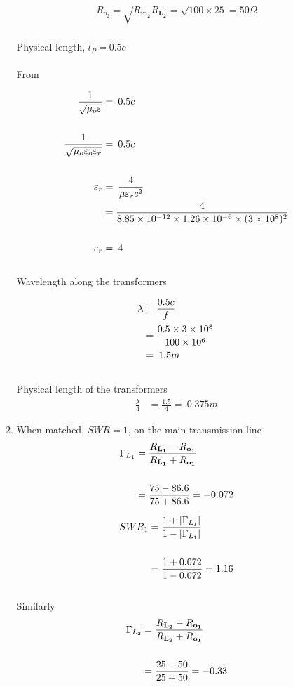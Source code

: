 \documentclass[12pt,a4paper,openright]{report}
\begin{document}
\begin{enumerate}
\begin{enumerate}
			\begin{align*}
			R_{o_2}=\sqrt{R_\mathbf{in_2}R_\mathbf{L_2}}=\sqrt{100\times25}=50\Omega
			\end{align*}
			\\
			Physical length, $l_{P}=0.5c$
			\\
			\\
			From
			
			\begin{align*}
			\frac{1}{\sqrt{\mu_{o} \varepsilon}}&=\medspace 0.5c\\\linebreak\\\notag\frac{1}{\sqrt{\mu_{o} \varepsilon_{o}\varepsilon_{r}}}&=\medspace 0.5c\\\linebreak\\\notag\varepsilon_{r}&=\medspace\frac{4}{\mu\varepsilon_{r}c^2}\\&\notag=\frac{4}{8.85\times10^{-12}\times1.26\times10^{-6}\times(3\times10^{8})^2}\\\linebreak\\\notag\varepsilon_{r}&=\medspace 4
			\end{align*}
			\\
			Wavelength along the transformers
			
			\begin{align*}
			\lambda&=\frac{0.5c}{f}\\&\notag=\frac{0.5\times3\times10^8}{100\times10^6}\\&\notag=\medspace1.5m
			\end{align*}
			\\
			Physical length of the transformers
			\begin{align*}
			\frac{\lambda}{4}&=\frac{1.5}{4}=\medspace 0.375m
			\end{align*}
			
			\item When matched, $SWR=1$, on the main transmission line
			\begin{align*}
			\Gamma_{L_1}&=\frac{R_\mathbf{L_1}-R_\mathbf{o_1}}{R_\mathbf{L_1}+R_\mathbf{o_1}}\\\medskip\\&\notag=\frac{75-86.6}{75+86.6}=-0.072
			\end{align*}
			
			\begin{align*}
			SWR_{1}&=\frac{1+\vert\Gamma_{L_1}\vert}{1-\vert\Gamma_{L_1}\vert}\\\medskip\\&\notag=\frac{1+0.072}{1-0.072}=1.16
			\end{align*}
			\\
			Similarly
			\begin{align*}
			\Gamma_{L_2}&=\frac{R_\mathbf{L_2}-R_\mathbf{o_1}}{R_\mathbf{L_2}+R_\mathbf{o_1}}\\\medskip\\&\notag=\frac{25-50}{25+50}=-0.33
			\end{align*}
			

\end{enumerate}
\end{enumerate}
\end{document}

